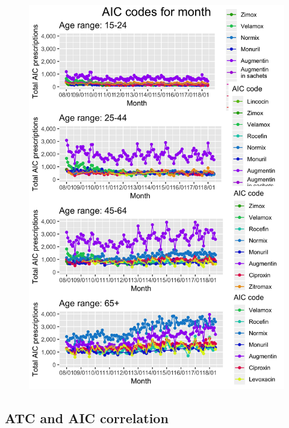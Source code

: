 \begin{figure}[h]
	\centering
	\includegraphics[scale=0.29]{../plots/top_aic_age-month.png}
\end{figure}

\subsection{ATC and AIC correlation}

